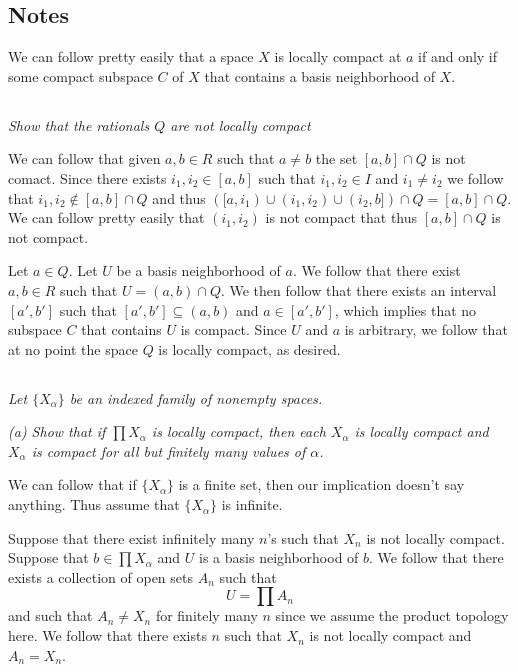 \documentclass[11pt,oneside,titlepage]{book}
\newcommand{\set}[1]{\{ #1 \}}
\begin{document}
\subsection*{Notes}

We can follow pretty easily that a space $X$ is locally compact at $a$ if and only if some compact
subspace $C$ of $X$ that contains a basis neighborhood of $X$.

\subsection{}

\textit{Show that the rationals $Q$ are not locally compact}

We can follow that given $a, b \in R$ such that $a \neq b$ the set $[a, b] \cap Q$ is not comact. 
Since there exists $i_1, i_2 \in [a, b]$ such that $i_1, i_2 \in I$ and $i_1 \neq i_2$
we follow that $i_1, i_2 \notin [a, b] \cap Q$ and thus $([a, i_1) \cup (i_1, i_2) \cup (i_2, b])
\cap Q = [a, b] \cap Q$. We can follow
pretty easily that $(i_1, i_2)$ is not compact that thus $[a, b] \cap Q$ is not compact.

Let $a \in Q$. Let $U$ be a basis neighborhood of $a$. We follow that there exist $a, b \in R$
such that $U = (a, b) \cap Q$. We then follow that there exists an interval $[a', b']$
such that $[a', b'] \subseteq (a, b)$ and $a \in [a', b']$, which implies that no
subspace $C$ that contains $U$ is compact. Since $U$ and $a$ is arbitrary, we follow that
at no point the space $Q$ is locally compact, as desired.

\subsection{}

\textit{Let $\set{X_\alpha}$ be an indexed family of nonempty spaces.}

\textit{(a) Show that if $\prod{X_\alpha}$ is locally compact, then each $X_\alpha$ is locally
  compact and $X_\alpha$ is compact for all but finitely many values of $\alpha$.}

We can follow that if $\set{X_\alpha}$ is a finite set, then our implication doesn't say anything.
Thus assume that $\set{X_\alpha}$ is infinite.

Suppose that there exist infinitely many $n$'s such that $X_n$ is not locally compact.
Suppose that $b \in \prod{X_\alpha}$ and $U$ is a basis neighborhood of $b$. We follow that
there exists a collection of open sets $A_n $ such that
$$U = \prod{A_n}$$
and such that $A_n \neq X_n$ for finitely many $n$ since we assume the product topology here.
We follow that there exists $n$ such that $X_n$ is not locally compact and $A_n = X_n$.
\end{document}
